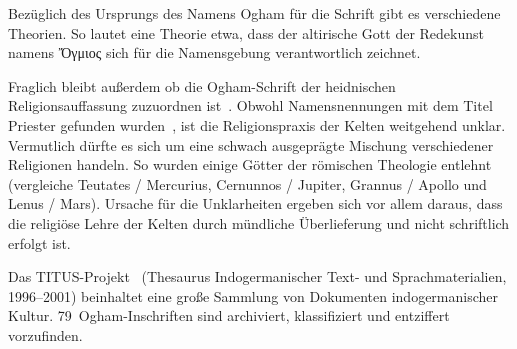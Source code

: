 \documentclass[a4paper]{scrartcl}
\begin{document}
Bezüglich des Ursprungs des Namens Ogham für die Schrift gibt es verschiedene Theorien. So lautet eine Theorie etwa, dass der altirische Gott der Redekunst namens \foreignlanguage{greek}{\ipafont Ὄγμιος} sich für die Namensgebung verantwortlich zeichnet. 

Fraglich bleibt außerdem ob die Ogham-Schrift der heidnischen Religionsauffassung zuzuordnen ist~\cite{ogham-heidnisch1,ogham-heidnisch2}. Obwohl Namensnennungen mit dem Titel Priester gefunden wurden~\cite[S. 36]{düwel}, ist die Religionspraxis der Kelten weitgehend unklar. Vermutlich dürfte es sich um eine schwach ausgeprägte Mischung verschiedener Religionen handeln. So wurden einige Götter der römischen Theologie entlehnt~\cite{ogham-religion} (vergleiche Teutates / Mercurius, Cernunnos / Jupiter, Grannus / Apollo und Lenus / Mars). Ursache für die Unklarheiten ergeben sich vor allem daraus, dass die religiöse Lehre der Kelten durch mündliche Überlieferung und nicht schriftlich erfolgt ist.

Das TITUS-Projekt~\cite{ogham-titus} (\glqq Thesaurus Indogermanischer Text- und Sprachmaterialien\grqq, 1996--2001) beinhaltet eine große Sammlung von Dokumenten indogermanischer Kultur. 79~Ogham-Inschriften sind archiviert, klassifiziert und entziffert vorzufinden.
\end{document}
